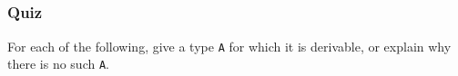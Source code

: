 \begin{fence}
\begin{code}%
\>[0]\AgdaSpace{}%
\AgdaSymbol{:}\AgdaSpace{}%
\AgdaSpace{}%
\AgdaSymbol{\{}\AgdaSymbol{\}}\AgdaSpace{}%
\AgdaSpace{}%
\AgdaSpace{}%
\AgdaSymbol{(}\AgdaSpace{}%
\AgdaSpace{}%
\AgdaSpace{}%
\AgdaSpace{}%
\AgdaSpace{}%
\AgdaSpace{}%
\AgdaSpace{}%
\AgdaSpace{}%
\AgdaSpace{}%
\AgdaSpace{}%
\AgdaSpace{}%
\AgdaSymbol{)}\<%
\\
\>[0]\AgdaSpace{}%
\AgdaSymbol{(}\AgdaSpace{}%
\AgdaSymbol{(}\AgdaSpace{}%
\AgdaSpace{}%
\AgdaSpace{}%
\AgdaSpace{}%
\AgdaSymbol{))}%
\>[29]\AgdaSymbol{=}%
\>[32]\AgdaSpace{}%
\AgdaSymbol{(}\AgdaSpace{}%
\AgdaSpace{}%
\AgdaSymbol{)}\<%
\\
\>[0][@{}l@{\AgdaIndent{0}}]%
\>[2]\<%
\\
%
\>[2]\AgdaSpace{}%
\AgdaSymbol{:}\AgdaSpace{}%
\AgdaSpace{}%
\AgdaSymbol{\{}\AgdaSpace{}%
\AgdaSymbol{\}}\AgdaSpace{}%
\AgdaSpace{}%
\AgdaSpace{}%
\AgdaSymbol{(}\AgdaSpace{}%
\AgdaSpace{}%
\AgdaSpace{}%
\AgdaSpace{}%
\AgdaSymbol{)}\<%
\\
%
\>[2]\AgdaSpace{}%
\AgdaSymbol{()}\<%
\end{code}
\end{fence}

\hypertarget{quiz-3}{%
\subsubsection{Quiz}\label{quiz-3}}

For each of the following, give a type \texttt{A} for which it is
derivable, or explain why there is no such \texttt{A}.

